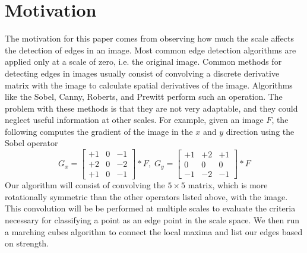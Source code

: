 \documentclass{article}
\begin{document}
\section{Motivation}
The motivation for this paper comes from observing how much the scale affects the detection of edges in an image. 
Most common edge detection algorithms are applied only at a scale of zero, i.e. the original image.
Common methods for detecting edges in images usually consist of convolving a discrete derivative matrix with the image to calculate spatial derivatives of the image.
Algorithms like the Sobel, Canny, Roberts, and Prewitt perform such an operation. 
The problem with these methods is that they are not very adaptable, and they could neglect useful information at other scales. 
For example, given an image ${F}$, the following computes the gradient of the image in the $x$ and $y$ direction using the Sobel operator
\begin{equation}
	{G}_x =
	\begin{bmatrix}
		+1 &0 &-1 \\
		+2 &0 &-2 \\
		+1 &0 &-1 
	\end{bmatrix}
	* {F}, \;
	{G}_y =
	\begin{bmatrix}
		+1 &+2 &+1 \\
		0 &0 &0 \\
		-1 &-2 &-1 
	\end{bmatrix}
	* {F}
\end{equation}
Our algorithm will consist of convolving the $5 \times 5$ matrix, which is more rotationally symmetric than the other operators listed above, with the image. 
This convolution will be be performed at multiple scales to evaluate the criteria necessary for classifying a point as an edge point in the scale space. 
We then run a marching cubes algorithm to connect the local maxima and list our edges based on strength.  
\end{document}
